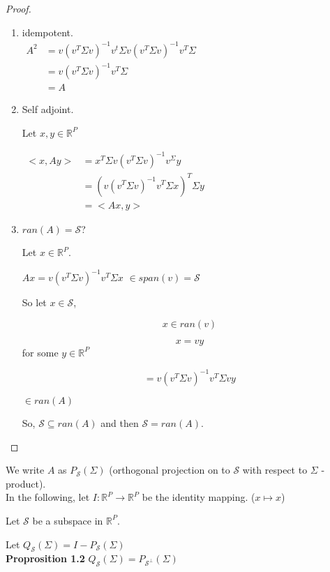 \documentclass[11pt,fleqn]{book} %
\begin{document}
\begin{proof}
	\begin{enumerate}
		\item idempotent.\\
		$\begin{aligned}
			A^2 &= v(v^T\Sigma v)^{-1} v^t \Sigma v (v^T \Sigma v)^{-1} v^T \Sigma\\
				&= v(v^T \Sigma v) ^{-1}v^T \Sigma\\
				&= A
		\end{aligned}$

		\item Self adjoint.

		Let $x, y \in \mathbb{R}^P$

		$\begin{aligned}
					<x,Ay> &= x^T \Sigma v(v^T \Sigma v)^{-1}v^ \Sigma y\\
					&= (v(v^T \Sigma v)^{-1} v^T \Sigma x)^T \Sigma y\\
					&= <Ax, y>
				\end{aligned}$

		\item $ran(A)= \mathscr{S}$?

		Let $x \in \mathbb{R}^P$. 

		$Ax = v(v^T \Sigma v)^{-1} v^T \Sigma x$
		$\in span(v) = \mathscr{S}$ 

		So let $x \in \mathscr{S}$, 

		$$x \in ran(v)$$

		$$x = vy $$ for some $y \in \mathbb{R}^P$

		$$= v(v^T \Sigma v)^{-1} v^T \Sigma vy $$

		$\in ran(A)$

		So, $\mathscr{S} \subseteq ran(A)$ and then $\mathscr{S} = ran(A)$.
	\end{enumerate}
\end{proof}

We write $A$ as $P_\mathscr{S} (\Sigma)$ (orthogonal projection on to $\mathscr{S}$ with respect to $\Sigma$ - product). \\ 

In the following, let $I: \mathbb{R}^P \rightarrow \mathbb{R}^P$ be the identity mapping. ($x \mapsto x$)

Let $\mathscr{S}$ be a subspace in $\mathbb{R}^P$. 

Let $Q_\mathscr{S} (\Sigma) = I - P_\mathscr{S} (\Sigma)$\\

\textbf{Proprosition 1.2} $Q_\mathscr{S} (\Sigma) = P_{\mathscr{S}^\perp} (\Sigma)$
\end{document}
